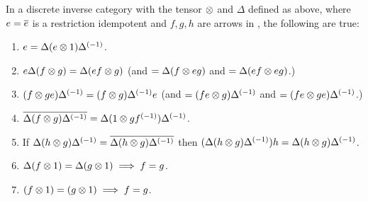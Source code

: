 \begin{lemma}\label{lem:properties_of_delta_and_tensor_in_a_discrete_inverse_category}
  In a discrete inverse category \X with the tensor $\otimes$ and $\Delta$ defined as above, where
  $e=\overline{e}$ is a restriction idempotent and $f,g,h$ are arrows in \X, the following are true:
  \begin{enumerate}[{(}i{)}]
    \item{}$e=\Delta (e\otimes 1) {\Delta}^{(-1)}$.\label{le:eisde1}
    \item{}$e\Delta (f \otimes g) = \Delta (e f \otimes g) $ (and $= \Delta (f \otimes e g) $ and 
      $ = \Delta (e f \otimes e g)$.)\label{le:deltaefg}
    \item{}$ (f \otimes g e) {\Delta}^{(-1)} =(f \otimes g) {\Delta}^{(-1)} e $ (and $= (f e\otimes g) {\Delta}^{(-1)}$ and
      $ = (f e\otimes g e){\Delta}^{(-1)}$.)\label{le:efginvdelta}
    \item{}$\overline{\Delta (f \otimes g) {\Delta}^{(-1)}} =
       \Delta(1\otimes g {f}^{(-1)}){\Delta}^{(-1)}$. \label{le:restfg}
    \item{} If $\Delta (h \otimes g) {\Delta}^{(-1)} = \overline{\Delta (h \otimes g) {\Delta}^{(-1)}}$ then
      $(\Delta (h \otimes g) {\Delta}^{(-1)}) h = \Delta (h \otimes g) {\Delta}^{(-1)}$.\label{le:hge}
    \item{}$\Delta (f\otimes1) = \Delta (g\otimes1) \implies f = g$.\label{le:dfgisfg}
    \item{}$(f\otimes1) = (g\otimes1) \implies f = g$.\label{le:fgisfg}
  \end{enumerate}
\end{lemma}
